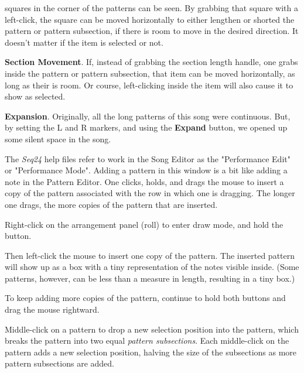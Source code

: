 \begin{enumber}
         squares in the corner of the patterns can be seen.  By grabbing
         that square with a left-click, the square can be moved horizontally
         to either lengthen or shorted the pattern or pattern subsection, if
         there is room to move in the desired direction.
         It doesn't matter if the item is selected or not.
      \item \textbf{Section Movement}.
         If, instead of grabbing the section length handle, one grabs inside
         the pattern or pattern subsection, that item can be moved
         horizontally, as long as their is room.  Or course, left-clicking
         inside the item will also cause it to show as selected.
      \item \textbf{Expansion}.
         Originally, all the long patterns of this song were continuous.
         But, by setting the L and R markers, and using the \textbf{Expand}
         button, we opened up some silent space in the song.
   \end{enumber}

   The \textsl{Seq24} help files refer to work in the Song Editor as the
   "Performance Edit" or "Performance Mode".  Adding a pattern in this
   window is a bit like adding a note in the Pattern Editor.
   One clicks, holds, and drags the mouse to insert a copy of the pattern
   associated with the row in which one is dragging.  The longer one drags,
   the more copies of the pattern that are inserted.

	Right-click on the arrangement panel (roll) to enter
   draw mode, and hold the button.

   Then left-click the mouse to insert one copy of the pattern.  The
   inserted pattern will show up as a box with a tiny representation of the
   notes visible inside.  (Some patterns, however, can be less than a
   measure in length, resulting in a tiny box.)

   To keep adding more copies of the pattern, continue to hold both buttons
   and drag the mouse rightward.

   Middle-click on a pattern to drop a new selection position into the
   pattern,
   which breaks the pattern into two equal \textsl{pattern subsections}.
   Each middle-click on the pattern adds a new selection position,
   halving the size of the subsections as more pattern subsections are
   added.

